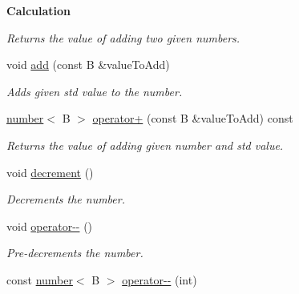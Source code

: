 \begin{Indent}{\bf Calculation}
\begin{DoxyCompactItemize}
\begin{DoxyCompactList}\small\item\em Returns the value of adding two given numbers. \end{DoxyCompactList}\item 
void \hyperlink{classcjr_1_1number_a4a3990a55896edfa85639c57d8c3c699}{add} (const B \&value\-To\-Add)
\begin{DoxyCompactList}\small\item\em Adds given std value to the number. \end{DoxyCompactList}\item 
\hypertarget{classcjr_1_1number_af4753e77a4277f4290219e4e91763d8c}{\hyperlink{classcjr_1_1number}{number}$<$ B $>$ \hyperlink{classcjr_1_1number_af4753e77a4277f4290219e4e91763d8c}{operator+} (const B \&value\-To\-Add) const }\label{classcjr_1_1number_af4753e77a4277f4290219e4e91763d8c}

\begin{DoxyCompactList}\small\item\em Returns the value of adding given number and std value. \end{DoxyCompactList}\item 
\hypertarget{classcjr_1_1number_a26eef97a8cbcf837b65e7dda206e623d}{void \hyperlink{classcjr_1_1number_a26eef97a8cbcf837b65e7dda206e623d}{decrement} ()}\label{classcjr_1_1number_a26eef97a8cbcf837b65e7dda206e623d}

\begin{DoxyCompactList}\small\item\em Decrements the number. \end{DoxyCompactList}\item 
\hypertarget{classcjr_1_1number_a2ffbd3e053d87dd7d53381df55111a79}{void \hyperlink{classcjr_1_1number_a2ffbd3e053d87dd7d53381df55111a79}{operator-\/-\/} ()}\label{classcjr_1_1number_a2ffbd3e053d87dd7d53381df55111a79}

\begin{DoxyCompactList}\small\item\em Pre-\/decrements the number. \end{DoxyCompactList}\item 
\hypertarget{classcjr_1_1number_a53449243aa05abff7e091030de0e3028}{const \hyperlink{classcjr_1_1number}{number}$<$ B $>$ \hyperlink{classcjr_1_1number_a53449243aa05abff7e091030de0e3028}{operator-\/-\/} (int)}\label{classcjr_1_1number_a53449243aa05abff7e091030de0e3028}


\end{DoxyCompactItemize}
\end{Indent}
